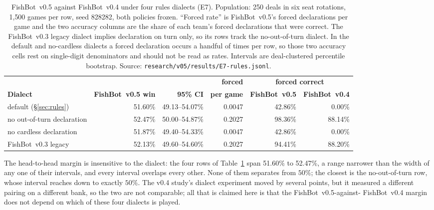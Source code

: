 \documentclass[11pt]{article}
\theoremstyle{definition}
\DeclareRobustCommand{\vfive}{\texorpdfstring{\mbox{FishBot v0.5}}{FishBot v0.5}}
\DeclareRobustCommand{\vfour}{\texorpdfstring{\mbox{FishBot v0.4}}{FishBot v0.4}}
\DeclareRobustCommand{\vthree}{\texorpdfstring{\mbox{FishBot v0.3}}{FishBot v0.3}}
\providecommand{\numDialectSeed}{828282}
\providecommand{\numDialectDeals}{250}
\providecommand{\numDialectDefault}{51.60}
\providecommand{\numDialectDefaultCI}{49.13--54.07}
\providecommand{\numDialectDefaultForcedFive}{42.86}
\providecommand{\numDialectDefaultForcedFour}{0.00}
\providecommand{\numDialectDefaultForcedRate}{0.0047}
\providecommand{\numDialectGames}{1{,}500}
\providecommand{\numDialectLegacy}{52.13}
\providecommand{\numDialectLegacyCI}{49.60--54.60}
\providecommand{\numDialectLegacyForcedFive}{94.41}
\providecommand{\numDialectLegacyForcedFour}{88.20}
\providecommand{\numDialectLegacyForcedRate}{0.2027}
\providecommand{\numDialectNoCardless}{51.87}
\providecommand{\numDialectNoCardlessCI}{49.40--54.33}
\providecommand{\numDialectNoCardlessForcedFive}{42.86}
\providecommand{\numDialectNoCardlessForcedFour}{0.00}
\providecommand{\numDialectNoCardlessForcedRate}{0.0047}
\providecommand{\numDialectNoOOT}{52.47}
\providecommand{\numDialectNoOOTCI}{50.00--54.87}
\providecommand{\numDialectNoOOTForcedFive}{98.36}
\providecommand{\numDialectNoOOTForcedFour}{88.14}
\providecommand{\numDialectNoOOTForcedRate}{0.2027}
\begin{document}
\begin{table}[t]
\centering
\caption{\vfive{} against \vfour{} under four rules dialects (E7). Population:
\numDialectDeals{} deals in six seat rotations, \numDialectGames{} games per row,
seed \numDialectSeed{}, both policies frozen. ``Forced rate'' is \vfive{}'s
forced declarations per game and the two accuracy columns are the share of each
team's forced declarations that were correct. The \vthree{} legacy dialect
implies declaration on turn only, so its rows track the no-out-of-turn dialect. In
the default and no-cardless dialects a forced declaration occurs a handful of
times per row, so those two accuracy cells rest on single-digit denominators and
should not be read as rates. Intervals are deal-clustered percentile bootstrap.
Source:
\texttt{research/v05/results/E7-rules.jsonl}.}
\label{tab:dialects-v05}
\footnotesize
\begin{tabular}{lrrrrr}
\toprule
& & & \textbf{forced} & \multicolumn{2}{c}{\textbf{forced correct}} \\
\cmidrule(lr){5-6}
\textbf{Dialect} & \textbf{\vfive{} win} & \textbf{95\% CI}
  & \textbf{per game} & \textbf{\vfive{}} & \textbf{\vfour{}} \\
\midrule
default (\S\ref{sec:rules}) & \numDialectDefault\%    & \numDialectDefaultCI\%    & \numDialectDefaultForcedRate{}    & \numDialectDefaultForcedFive\%    & \numDialectDefaultForcedFour\% \\
no out-of-turn declaration & \numDialectNoOOT\%      & \numDialectNoOOTCI\%      & \numDialectNoOOTForcedRate{}      & \numDialectNoOOTForcedFive\%      & \numDialectNoOOTForcedFour\% \\
no cardless declaration & \numDialectNoCardless\% & \numDialectNoCardlessCI\% & \numDialectNoCardlessForcedRate{} & \numDialectNoCardlessForcedFive\% & \numDialectNoCardlessForcedFour\% \\
\vthree{} legacy & \numDialectLegacy\%     & \numDialectLegacyCI\%     & \numDialectLegacyForcedRate{}     & \numDialectLegacyForcedFive\%     & \numDialectLegacyForcedFour\% \\
\bottomrule
\end{tabular}
\end{table}

The head-to-head margin is insensitive to the dialect: the four rows of
Table~\ref{tab:dialects-v05} span \numDialectDefault\% to \numDialectNoOOT\%,
a range narrower than the width of any one of their intervals, and every interval
overlaps every other. None of them separates from $50\%$; the closest is the
no-out-of-turn row, whose interval reaches down to exactly
$50\%$. The v0.4 study's dialect experiment moved by
several points, but it measured a different pairing on a different bank, so the
two are not comparable; all that is claimed here is that the \vfive{}-against-
\vfour{} margin does not depend on which of these four dialects is played.
\end{document}
